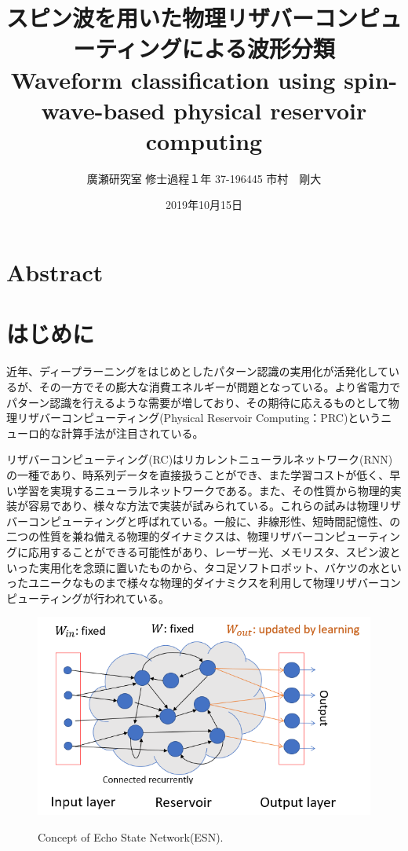 \documentclass[a4j, twocolumn]{jsarticle}
\title{スピン波を用いた物理リザバーコンピューティングによる波形分類\\Waveform classification using spin-wave-based physical reservoir computing}
\author{廣瀬研究室 修士過程１年 37-196445 市村　剛大}
\date{2019年10月15日}
\begin{document}

\section*{Abstract}


\section{はじめに}
近年、ディープラーニングをはじめとしたパターン認識の実用化が活発化しているが、その一方でその膨大な消費エネルギーが問題となっている。より省電力でパターン認識を行えるような需要が増しており、その期待に応えるものとして物理リザバーコンピューティング(Physical Reservoir Computing：PRC)というニューロ的な計算手法が注目されている。

リザバーコンピューティング(RC)はリカレントニューラルネットワーク(RNN)の一種であり、時系列データを直接扱うことができ、また学習コストが低く、早い学習を実現するニューラルネットワークである。また、その性質から物理的実装が容易であり、様々な方法で実装が試みられている。これらの試みは物理リザバーコンピューティングと呼ばれている。一般に、非線形性、短時間記憶性、の二つの性質を兼ね備える物理的ダイナミクスは、物理リザバーコンピューティングに応用することができる可能性があり、レーザー光\cite{opt}、メモリスタ、スピン波\cite{spin_reservoir}といった実用化を念頭に置いたものから、タコ足ソフトロボット\cite{Nakajima2015SciReo:_infor_proce_via_physi_soft_body}、バケツの水\cite{Fernando2003AL:_patter_recog_in_a_bucke}といったユニークなものまで様々な物理的ダイナミクスを利用して物理リザバーコンピューティングが行われている。

\begin{figure}
\centering
\includegraphics[width=1\hsize]{./figures/esn}\\
\caption{Concept of Echo State Network(ESN).}
\label{fig:esn}
\end{figure}
\end{document}
